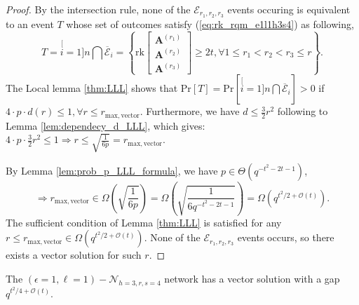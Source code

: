 \begin{proof}
By the intersection rule, none of the $\mathcal{E}_{r_{1},r_{2},r_{3}}$
events occuring is equivalent to an event $T$ whose set of outcomes
satisfy (\ref{eq:rk_rqm_e1l1h3s4}) as following,
\[
T=\stackrel[i=1]{n}{\bigcap}\overline{\mathcal{E}}_{i}=\left\{ \mathrm{rk}\left[\begin{array}{c}
\boldsymbol{A}^{\left(r_{1}\right)}\\
\boldsymbol{A}^{\left(r_{2}\right)}\\
\boldsymbol{A}^{\left(r_{3}\right)}
\end{array}\right]\geq2t,\forall1\leq r_{1}<r_{2}<r_{3}\leq r\right\} .
\]
The Local lemma \ref{thm:LLL} shows that $\mathrm{Pr}\left[T\right]=\mathrm{Pr}\left[\stackrel[i=1]{n}{\bigcap}\overline{\mathcal{E}}_{i}\right]>0$
if $4\cdot p\cdot d(r)\leq1,\forall r\leq r_{\mathrm{max,vector}}$.
Furthermore, we have $d\leq\frac{3}{2}r^{2}$ following to Lemma \ref{lem:dependecy_d_LLL},
which gives: $4\cdot p\cdot\frac{3}{2}r^{2}\leq1\Rightarrow r\leq\sqrt{\frac{1}{6p}}=r_{\mathrm{max,vector}}$.

By Lemma \ref{lem:prob_p_LLL_formula}, we have $p\in\Theta\left(q^{-t^{2}-2t-1}\right)$,
\[
\Rightarrow r_{\mathrm{max,vector}}\in\Omega\left(\sqrt{\frac{1}{6p}}\right)=\Omega\left(\sqrt{\frac{1}{6q^{-t^{2}-2t-1}}}\right)=\Omega\left(q^{t^{2}/2+\mathcal{O}\left(t\right)}\right).
\]
The sufficient condition of Lemma \ref{thm:LLL} is satisfied for
any $r\leq r_{\mathrm{max,vector}}\in\Omega\left(q^{t^{2}/2+\mathcal{O}\left(t\right)}\right)$.
None of the $\mathcal{E}_{r_{1},r_{2},r_{3}}$ events occurs, so there
exists a vector solution for such $r$.
\end{proof}
\begin{cor}
The $\left(\epsilon=1,\ell=1\right)-\mathcal{N}_{h=3,r,s=4}$ network
has a vector solution with a gap $q^{t^{2}/4+\mathcal{O}(t)}$.
\end{cor}
